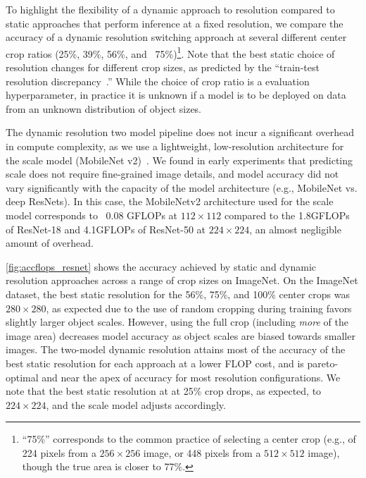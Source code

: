 To highlight the flexibility of a dynamic approach to resolution compared to static approaches that perform inference at a fixed resolution, we compare the accuracy of a dynamic resolution switching approach at several different center crop ratios (25\%, 39\%, 56\%, and ~75\%)\footnote{``75\%'' corresponds to the common practice of selecting a center crop (e.g., of 224 pixels from a $256\times256$ image, or 448 pixels from a $512\times512$ image), though the true area is closer to 77\%.}.
 Note that the best static choice of resolution changes for different crop sizes, as predicted by the ``train-test resolution discrepancy~\cite{touvron2019fixing}.''
While the choice of crop ratio is a evaluation hyperparameter, in practice it is unknown if a model is to be deployed on data from an unknown distribution of object sizes.

The dynamic resolution two model pipeline does not incur a significant overhead in compute complexity, as we use a lightweight, low-resolution architecture for the scale model (MobileNet v2)~\cite{sandler2018mobilenetv2}. 
We found in early experiments that predicting scale does not require fine-grained image details, and model accuracy did not vary significantly with the capacity of the model architecture (e.g., MobileNet vs. deep ResNets). 
In this case, the MobileNetv2 architecture used for the scale model corresponds to ~0.08 GFLOPs at $112\times112$ compared to the 1.8GFLOPs of ResNet-18 and 4.1GFLOPs of ResNet-50 at $224\times224$, an almost negligible amount of overhead.

\autoref{fig:accflops_resnet} shows the accuracy achieved by static and dynamic resolution approaches across a range of crop sizes on ImageNet.
On the ImageNet dataset, the best static resolution for the 56\%, 75\%, and 100\% center crops was $280\times280$, as expected due to the use of random cropping during training favors slightly larger object scales.
However, using the full crop (including \emph{more} of the image area) decreases model accuracy as object scales are biased towards smaller images.
The two-model dynamic resolution attains most of the accuracy of the best static resolution for each approach at a lower FLOP cost, and is pareto-optimal and near the apex of accuracy for most resolution configurations.
We note that the best static resolution at at 25\% crop drops, as expected, to $224\times224$, and the scale model adjusts accordingly. 

